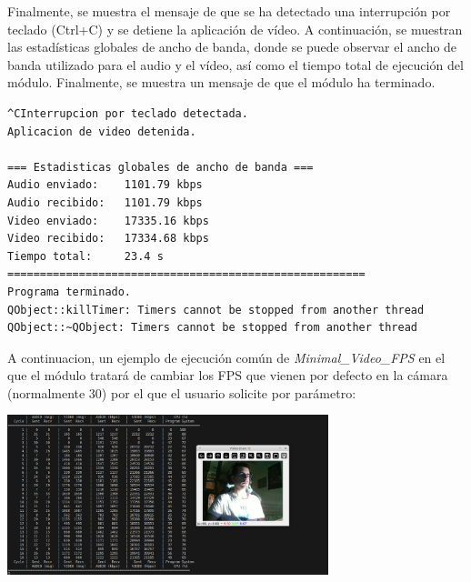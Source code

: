 Finalmente, se muestra el mensaje de que se ha detectado una interrupción por teclado (Ctrl+C) y se detiene la aplicación de vídeo. A continuación, se muestran las estadísticas globales de ancho de banda, donde se puede observar el ancho de banda utilizado para el audio y el vídeo, así como el tiempo total de ejecución del módulo. Finalmente, se muestra un mensaje de que el módulo ha terminado.
\begin{lstlisting}[language=bash,basicstyle=\ttfamily\scriptsize]
^CInterrupcion por teclado detectada.
Aplicacion de video detenida.

=== Estadisticas globales de ancho de banda ===
Audio enviado:    1101.79 kbps
Audio recibido:   1101.79 kbps
Video enviado:    17335.16 kbps
Video recibido:   17334.68 kbps
Tiempo total:     23.4 s
=======================================================
Programa terminado.
QObject::killTimer: Timers cannot be stopped from another thread
QObject::~QObject: Timers cannot be stopped from another thread
\end{lstlisting}
\vspace{\baselineskip}

A continuacion, un ejemplo de ejecución común de \textit{Minimal\_Video\_FPS} en el que el módulo tratará de cambiar los FPS que vienen por defecto en la cámara (normalmente 30) por el que el usuario solicite por parámetro:
\begin{center}
	\includegraphics[width = 0.7\textwidth]{images/pruebas/ejecuion_normal_fps.png}
	\label{fig:ejecucion_fps}
\end{center}
\vspace{\baselineskip}

